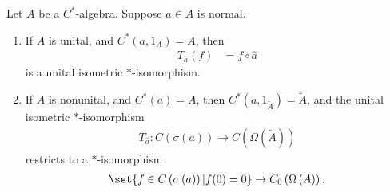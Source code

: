 \documentclass[10pt]{mypackage}
\begin{document}
\begin{corollary}
  Let $A$ be a $C^{\ast}$-algebra. Suppose $a\in A$ is normal.
  \begin{enumerate}[(1)]
    \item If $A$ is unital, and $C^{\ast}\left(a,1_A\right) = A$, then
      \begin{align*}
        T_{\hat{a}}\left(f\right) &= f\circ \hat{a}
      \end{align*}
      is a unital isometric $\ast$-isomorphism.
    \item If $A$ is nonunital, and $C^{\ast}\left(a\right) = A$, then $C^{\ast}\left(a,1_{\widetilde{A}}\right) = \widetilde{A}$, and the unital isometric $\ast$-isomorphism
      \begin{align*}
        T_{\hat{a}}\colon C\left(\sigma\left(a\right)\right)\rightarrow C\left(\Omega\left(\widetilde{A}\right)\right)
      \end{align*}
      restricts to a $\ast$-isomorphism
      \begin{align*}
        \set{f\in C\left(\sigma\left(a\right)\right) | f(0) = 0}\rightarrow C_0\left(\Omega\left(A\right)\right).
      \end{align*}
  \end{enumerate}
\end{corollary}
\end{document}
